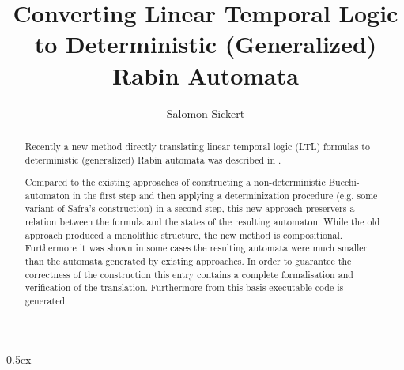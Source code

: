 \documentclass[11pt,a4paper]{article}
\begin{document}
\title{Converting Linear Temporal Logic to Deterministic (Generalized) Rabin Automata}
\author{Salomon Sickert}
\maketitle

\begin{abstract}
Recently a new method directly translating linear temporal logic (LTL) formulas to deterministic (generalized) Rabin automata was described in \cite{DBLP:journals/fmsd/EsparzaKS16}. 

Compared to the existing approaches of constructing a non-deterministic Buechi-automaton in the first step and then applying a determinization procedure (e.g. some variant of Safra's construction) in a second step, this new approach preservers a relation between the formula and the states of the resulting automaton. While the old approach produced a monolithic structure, the new method is compositional. Furthermore it was shown in some cases the resulting automata were much smaller than the automata generated by existing approaches. In order to guarantee the correctness of the construction this entry contains a complete formalisation and verification of the translation. Furthermore from this basis executable code is generated.
\end{abstract}

\tableofcontents

\parindent 0pt\parskip 0.5ex





\end{document}
